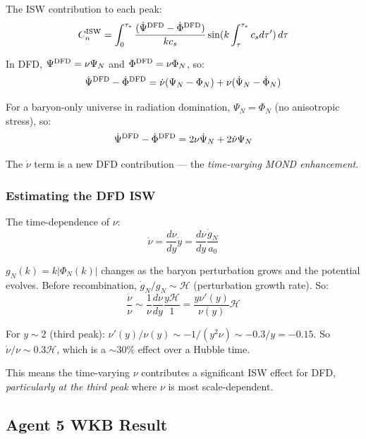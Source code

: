 \documentclass[11pt,a4paper]{article}
\begin{document}
The ISW contribution to each peak:
\begin{equation}
C_n^{\rm ISW} = \int_0^{\tau_*}\frac{(\dot{\Psi}^{\rm DFD} - \dot{\Phi}^{\rm DFD})}{kc_s}\sin(k\int_\tau^{\tau_*}c_s d\tau')\,d\tau
\end{equation}

In DFD, $\Psi^{\rm DFD} = \nu\Psi_N$ and $\Phi^{\rm DFD} = \nu\Phi_N$, so:
\begin{equation}
\dot{\Psi}^{\rm DFD} - \dot{\Phi}^{\rm DFD} = \dot{\nu}(\Psi_N - \Phi_N) + \nu(\dot{\Psi}_N - \dot{\Phi}_N)
\end{equation}

For a baryon-only universe in radiation domination, $\Psi_N = \Phi_N$ (no anisotropic stress), so:
\begin{equation}
\dot{\Psi}^{\rm DFD} - \dot{\Phi}^{\rm DFD} = 2\nu\dot{\Psi}_N + 2\dot{\nu}\Psi_N
\end{equation}

The $\dot{\nu}$ term is a new DFD contribution --- the \emph{time-varying MOND enhancement}.

\subsubsection{Estimating the DFD ISW}

The time-dependence of $\nu$:
\begin{equation}
\dot{\nu} = \frac{d\nu}{dy}\dot{y} = \frac{d\nu}{dy}\frac{\dot{g}_N}{a_0}
\end{equation}

$g_N(k) = k|\Phi_N(k)|$ changes as the baryon perturbation grows and the potential evolves. Before recombination, $\dot{g}_N/g_N \sim \mathcal{H}$ (perturbation growth rate). So:
\begin{equation}
\frac{\dot{\nu}}{\nu} \sim \frac{1}{\nu}\frac{d\nu}{dy}\frac{y\mathcal{H}}{1} = \frac{y\nu'(y)}{\nu(y)}\mathcal{H}
\end{equation}

For $y \sim 2$ (third peak): $\nu'(y)/\nu(y) \sim -1/(y^2\nu) \sim -0.3/y = -0.15$.
So $\dot{\nu}/\nu \sim 0.3\mathcal{H}$, which is a $\sim 30\%$ effect over a Hubble time.

This means the time-varying $\nu$ contributes a significant ISW effect for DFD, \emph{particularly at the third peak} where $\nu$ is most scale-dependent.

\subsection{Agent 5 WKB Result}
\end{document}
